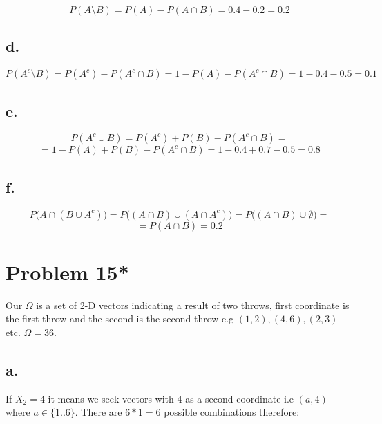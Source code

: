 \documentclass{article}
\begin{document}
\begin{equation*}
    P(A \setminus B) = P(A) - P(A \cap B) = 0.4 - 0.2 = 0.2
\end{equation*}

\subsection*{d.}
\begin{equation*}
    P(A^{c} \setminus B) = P(A^c) - P(A^{c} \cap B) = 1 - P(A) - P(A^{c} \cap B) = 1 - 0.4 - 0.5 = 0.1
\end{equation*}

\subsection*{e.}
\begin{equation*}
    P(A^{c} \cup B) = P(A^{c}) + P(B) - P(A^{c} \cap B) = 
\end{equation*}
\begin{equation*}
    = 1 - P(A) + P(B) - P(A^{c} \cap B) = 1 - 0.4 + 0.7 - 0.5 = 0.8
\end{equation*}

\subsection*{f.}
\begin{equation*}
    P\Big(A \cap (B \cup A^{c})\Big) = P\Big((A \cap B) \cup (A \cap A^{c})\Big) = P\Big((A \cap B) \cup \emptyset \Big) = 
\end{equation*}
\begin{equation*}
    = P(A \cap B) = 0.2
\end{equation*}

\section*{Problem 15*}

Our \(\Omega\) is a set of 2-D vectors indicating a result of two throws, first coordinate is the first throw and the second
is the second throw e.g \((1, 2), (4, 6), (2, 3)\) etc. \(\Omega = 36\).

\subsection*{a.}
If \(X_2 = 4\) it means we seek vectors with \(4\) as a second coordinate i.e \((a, 4)\) where \(a \in \{1..6\}\). There are \(6 * 1 = 6\) possible
combinations therefore:
\end{document}
